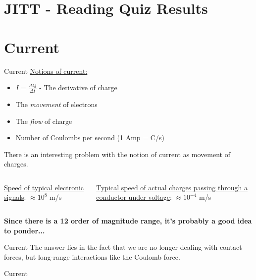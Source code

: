 \documentclass{beamer}
\begin{document}
\section{JITT - Reading Quiz Results}

\section{Current}

\begin{frame}{Current}
\underline{Notions of current:}
\begin{itemize}
	\item $I = \frac{\Delta Q}{\Delta t}$ - The derivative of charge
	\item The \textit{movement} of electrons
	\item The \textit{flow} of charge
	\item Number of Coulombs per second (1 Amp = C/s)
\end{itemize}
There is an interesting problem with the notion of current as movement of charges. \\ \vspace{0.5cm}
\begin{columns}[T]
\begin{column}{0.5\textwidth}
\underline{Speed of typical electronic signals}: $\approx 10^{8}$ m/s
\end{column}
\begin{column}{0.5\textwidth}
\underline{Typical speed of actual charges passing through a conductor under voltage}: $\approx 10^{-4}$ m/s
\end{column}
\end{columns} \vspace{1cm}
\textbf{Since there is a 12 order of magnitude range, it's probably a good idea to ponder...}
\end{frame}

\begin{frame}{Current}
The answer lies in the fact that we are no longer dealing with \alert{contact forces}, but long-range interactions like the Coulomb force. \\
\end{frame}

\begin{frame}{Current}
\end{frame}
\end{document}
